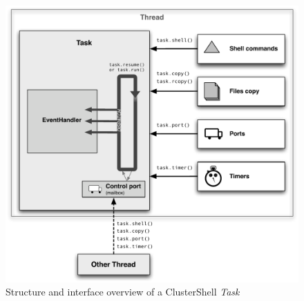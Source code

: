\documentclass[english,a4paper]{csuserguide}
\newcommand{\Task}{\textit{Task}\xspace}
\begin{document}
\begin{figure}[!ht]
\begin{center}
\includegraphics[scale=0.80]{TaskInterface}
\caption{Structure and interface overview of a ClusterShell \Task}
\label{TaskInterface}
\end{center}
\end{figure}
\end{document}
